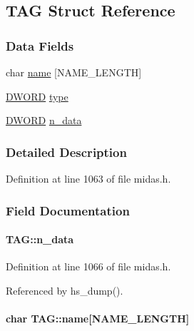 \subsection{TAG Struct Reference}
\label{structTAG}
\subsubsection*{Data Fields}
\begin{DoxyCompactItemize}
\item 
char \hyperlink{structTAG_adaae8cfc5a71c4b4e1aca03df024dcf2}{name} \mbox{[}NAME\_\-LENGTH\mbox{]}
\item 
\hyperlink{vt2_8h_a798af1e30bc65f319c1a246cecf59e39}{DWORD} \hyperlink{structTAG_a3fdedadca645679ef114cc651a978d17}{type}
\item 
\hyperlink{vt2_8h_a798af1e30bc65f319c1a246cecf59e39}{DWORD} \hyperlink{structTAG_aec010a11e0792b46f71ba64fae6f44e8}{n\_\-data}
\end{DoxyCompactItemize}


\subsubsection{Detailed Description}


Definition at line 1063 of file midas.h.

\subsubsection{Field Documentation}
\paragraph[{n\_\-data}]{ {\bf TAG::n\_\-data}}\hfill\label{structTAG_aec010a11e0792b46f71ba64fae6f44e8}

\begin{DoxyItemize}
\item 
\end{DoxyItemize}

Definition at line 1066 of file midas.h.

Referenced by hs\_\-dump().
\paragraph[{name}]{\setlength{\rightskip}{0pt plus 5cm}char {\bf TAG::name}\mbox{[}NAME\_\-LENGTH\mbox{]}}\hfill\label{structTAG_adaae8cfc5a71c4b4e1aca03df024dcf2}

